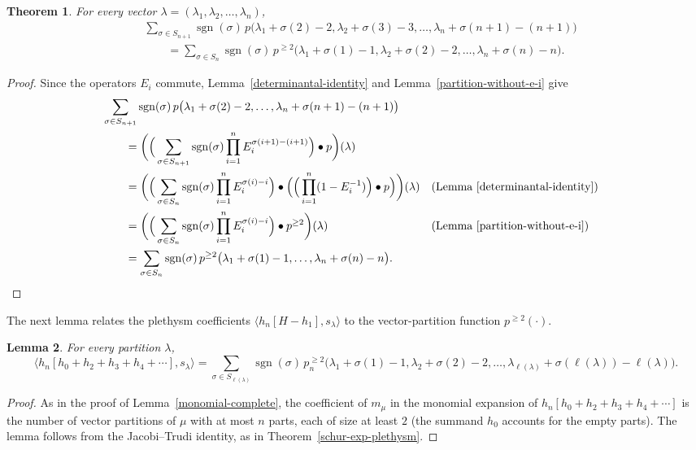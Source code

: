 \documentclass[reqno]{amsart}
\theoremstyle{plain}
\newtheorem{theorem}{Theorem}[section]
\newtheorem{lemma}[theorem]{Lemma}
\theoremstyle{definition}
\theoremstyle{remark}
\theoremstyle{plain}
\DeclareMathOperator{\sgn}{sgn}
\begin{document}
\begin{theorem}\label{equality-of-vector-partitions}
For every vector $\lambda=(\lambda_1,\lambda_2,\dots,\lambda_n)$,
\begin{align*}
&\sum_{\sigma\in S_{n+1}}\sgn(\sigma)\,p\big(\lambda_1+\sigma(2)-2,\lambda_2+\sigma(3)-3,\dots,\lambda_n+\sigma(n+1)-(n+1)\big)\\
&\qquad=\sum_{\sigma\in S_n}\sgn(\sigma)\,p^{\geq 2}\big(\lambda_1+\sigma(1)-1,\lambda_2+\sigma(2)-2,\dots,\lambda_n+\sigma(n)-n\big).
\end{align*}
\end{theorem}
\begin{proof}
Since the operators $E_i$ commute, Lemma~\ref{determinantal-identity}
and Lemma~\ref{partition-without-e-i} give
\begin{align*}
&\sum_{\sigma\in S_{n+1}}\sgn(\sigma)\,p\big(\lambda_1+\sigma(2)-2,\dots,\lambda_n+\sigma(n+1)-(n+1)\big)\\
&\qquad=\bigg(\Big(\sum_{\sigma\in S_{n+1}}\sgn(\sigma)\prod_{i=1}^nE_i^{\sigma(i+1)-(i+1)}\Big)\bullet p\bigg)(\lambda)\\
&\qquad=\bigg(\Big(\sum_{\sigma\in S_n}\sgn(\sigma)\prod_{i=1}^nE_i^{\sigma(i)-i}\Big)\bullet\Big(\Big(\prod_{i=1}^n(1-E_i^{-1})\Big)\bullet p\Big)\bigg)(\lambda) &&\text{(Lemma~\ref{determinantal-identity})}\\
&\qquad=\bigg(\Big(\sum_{\sigma\in S_n}\sgn(\sigma)\prod_{i=1}^nE_i^{\sigma(i)-i}\Big)\bullet p^{\ge2}\bigg)(\lambda) &&\text{(Lemma~\ref{partition-without-e-i})}\\
&\qquad=\sum_{\sigma\in S_n}\sgn(\sigma)\,p^{\geq 2}\big(\lambda_1+\sigma(1)-1,\dots,\lambda_n+\sigma(n)-n\big).
\end{align*}
\end{proof}

The next lemma relates the plethysm coefficients $\langle h_n[H-h_1],s_\lambda\rangle$
to the vector-partition function $p^{\ge 2}(\cdot)$.

\begin{lemma}\label{greater-2-lemma}
For every partition $\lambda$,
$$\langle h_{n}[h_0+h_2+h_3+h_4+\cdots],s_\lambda\rangle=\sum_{\sigma\in S_{\ell(\lambda)}}\sgn(\sigma)\,p_{n}^{\geq 2}\big(\lambda_1+\sigma(1)-1,\lambda_2+\sigma(2)-2,\dots,\lambda_{\ell(\lambda)}+\sigma(\ell(\lambda))-\ell(\lambda)\big).$$
\end{lemma}
\begin{proof}
As in the proof of Lemma~\ref{monomial-complete}, the coefficient of $m_\mu$ in
the monomial expansion of $h_{n}[h_0+h_2+h_3+h_4+\cdots]$ is the number of
vector partitions of $\mu$ with at most $n$ parts, each of size at least $2$
(the summand $h_0$ accounts for the empty parts). The lemma follows from the
Jacobi--Trudi identity, as in Theorem~\ref{schur-exp-plethysm}.
\end{proof}
\end{document}
